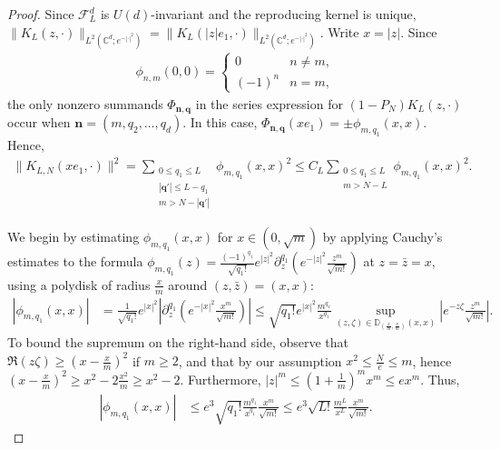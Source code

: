 \documentclass[11pt]{amsart}
\begin{document}
\begin{proof}
    Since $\mathcal F^d_L$ is $U(d)$-invariant and the reproducing kernel is unique, $\| K_L(z,\cdot) \|_{L^2(\mathbb C^d;e^{-|\cdot|^2})} = \| K_L(|z| e_1, \cdot) \|_{L^2(\mathbb C^d;e^{-|\cdot|^2})}$. Write $x = |z|$. Since 
    \begin{align*}
        \phi_{n,m}(0,0) = \begin{cases} 0 & n \neq m, \\
                                                                 (-1)^n & n = m,
                                                    \end{cases}
    \end{align*}
    the only nonzero summands $\Phi_{\mathbf n,\mathbf q}$ in the series expression for $(1-P_{N}) K_L(z,\cdot)$ occur when $\mathbf n = (m,q_2,\ldots,q_d)$. In this case, $\Phi_{\mathbf n,\mathbf q}(x e_1) = \pm\phi_{m,q_1}(x,x)$. Hence,
    \begin{align*}
        \| K_{L,N}(x e_1,\cdot) \|^2 = \sum_{\substack{0 \leq q_1 \leq L \\ |\mathbf q'| \leq L - q_1 \\ m > N-|\mathbf q'|}} \phi_{m,q_1}(x,x)^2 \leq C_L \sum_{\substack{0 \leq q_1 \leq L \\ m > N-L}} \phi_{m,q_1}(x,x)^2.
    \end{align*}

    We begin by estimating $\phi_{m,q_1}(x,x)$ for $x \in (0,\sqrt{m})$ by applying Cauchy's estimates to the formula $\phi_{m,q_1}(z) = \frac{(-1)^{q_1}}{\sqrt{q_1!}} e^{|z|^2} \partial_z^{q_1} (e^{-|z|^2} \frac{z^m}{\sqrt{m!}})$ at $z = \bar z = x$, using a polydisk of radius $\frac{x}{m}$ around $(z,\bar z) = (x,x)$:
    \begin{align*}
        |\phi_{m,q_1}(x,x)| &= \frac{1}{\sqrt{q_1!}} e^{|x|^2} \left| \partial_z^{q_1} (e^{-|x|^2} \frac{x^m}{\sqrt{m!}}) \right| \leq \sqrt{q_1!} e^{|x|^2} \frac{m^{q_1}}{x^{q_1}} \sup_{(z,\zeta) \in \mathbb D_{(\frac xm,\frac xm)}(x,x)}\left| e^{-z \zeta} \frac{z^m}{\sqrt{m!}} \right|.
    \end{align*}
    To bound the supremum on the right-hand side, observe that $\Re(z\zeta) \geq (x-\frac{x}{m})^2$ if $m \geq 2$, and that by our assumption $x^2 \leq \frac{N}{e} \leq m$, hence $(x-\frac{x}{m})^2 \geq x^2 - 2\frac{x^2}{m} \geq x^2 - 2$. Furthermore, $|z|^m \leq (1+\frac1m)^m x^m \leq e x^m$. Thus, 
    \begin{align*}
        |\phi_{m,q_1}(x,x)| &\leq e^3 \sqrt{q_1!} \frac{m^{q_1}}{x^{q_1}} \frac{x^m}{\sqrt{m!}} \leq e^3 \sqrt{L!} \frac{m^{L}}{x^{L}} \frac{x^m}{\sqrt{m!}}.
    \end{align*}
    

\end{proof}
\end{document}
